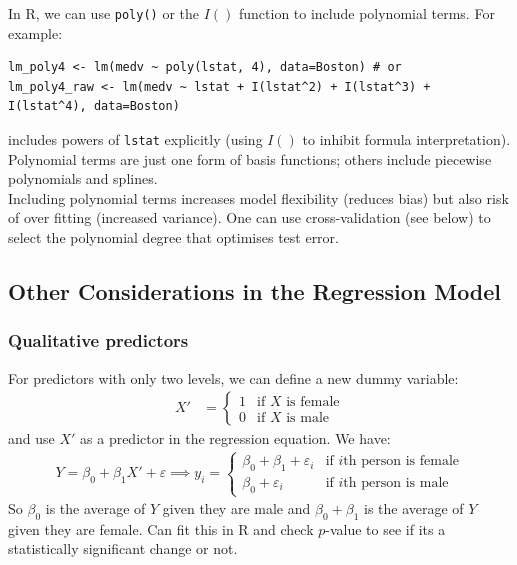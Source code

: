 \documentclass[11pt]{article}
\begin{document}
\noindent In R, we can use \texttt{poly()} or the $I()$ function to include polynomial terms. For example:
\begin{lstlisting}
lm_poly4 <- lm(medv ~ poly(lstat, 4), data=Boston) # or
lm_poly4_raw <- lm(medv ~ lstat + I(lstat^2) + I(lstat^3) + I(lstat^4), data=Boston)
\end{lstlisting}
includes powers of \texttt{lstat} explicitly (using $I()$ to inhibit formula interpretation). Polynomial terms are just one form of basis functions; others include piecewise polynomials and splines. \\

\noindent Including polynomial terms increases model flexibility (reduces bias) but also risk of over fitting (increased variance). One can use cross-validation (see below) to select the polynomial degree that optimises test error.

\subsection{Other Considerations in the Regression Model}
\subsubsection{Qualitative predictors}
\noindent For predictors with only two levels, we can define a new dummy variable:
\begin{align*}
    X' &= \begin{cases}
        1 & \text{if $X$ is female} \\
        0 & \text{if $X$ is male}
    \end{cases}
\end{align*}
\noindent and use $X'$ as a predictor in the regression equation. We have:
\begin{align*}
    Y = \beta_0 + \beta_1X' + \varepsilon \implies y_i = \begin{cases}
        \beta_0 + \beta_1 + \varepsilon_i & \text{if $i$th person is female} \\
        \beta_0 + \varepsilon_i & \text{if $i$th person is male}
    \end{cases}
\end{align*}
\noindent So $\beta_0$ is the average of $Y$ given they are male and $\beta_0 + \beta_1$ is the average of $Y$ given they are female. Can fit this in R and check $p$-value to see if its a statistically significant change or not. \\
\end{document}
